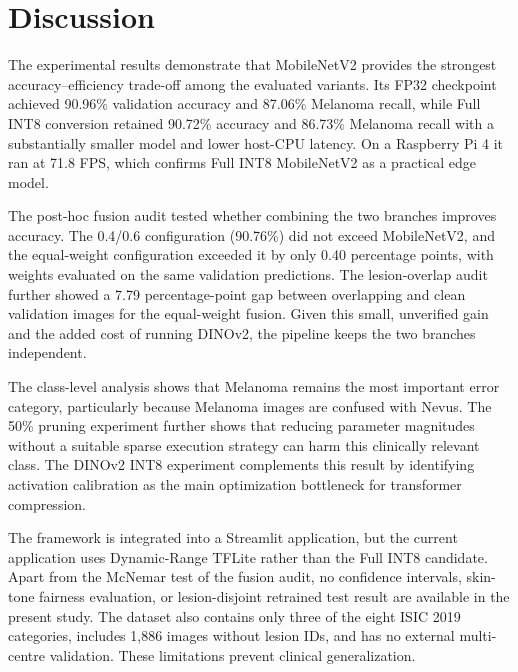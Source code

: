 \documentclass[3p,times,procedia]{elsarticle}
\begin{document}
\section{Discussion}
\label{sec:discussion}

The experimental results demonstrate that MobileNetV2 provides the strongest accuracy--efficiency trade-off among the evaluated variants. Its FP32 checkpoint achieved 90.96\% validation accuracy and 87.06\% Melanoma recall, while Full INT8 conversion retained 90.72\% accuracy and 86.73\% Melanoma recall with a substantially smaller model and lower host-CPU latency. On a Raspberry Pi 4 it ran at 71.8 FPS, which confirms Full INT8 MobileNetV2 as a practical edge model.

The post-hoc fusion audit tested whether combining the two branches improves accuracy. The 0.4/0.6 configuration (90.76\%) did not exceed MobileNetV2, and the equal-weight configuration exceeded it by only 0.40 percentage points, with weights evaluated on the same validation predictions. The lesion-overlap audit further showed a 7.79 percentage-point gap between overlapping and clean validation images for the equal-weight fusion. Given this small, unverified gain and the added cost of running DINOv2, the pipeline keeps the two branches independent.

The class-level analysis shows that Melanoma remains the most important error category, particularly because Melanoma images are confused with Nevus. The 50\% pruning experiment further shows that reducing parameter magnitudes without a suitable sparse execution strategy can harm this clinically relevant class. The DINOv2 INT8 experiment complements this result by identifying activation calibration as the main optimization bottleneck for transformer compression.

The framework is integrated into a Streamlit application, but the current application uses Dynamic-Range TFLite rather than the Full INT8 candidate. Apart from the McNemar test of the fusion audit, no confidence intervals, skin-tone fairness evaluation, or lesion-disjoint retrained test result are available in the present study. The dataset also contains only three of the eight ISIC 2019 categories, includes 1,886 images without lesion IDs, and has no external multi-centre validation. These limitations prevent clinical generalization.

\end{document}
